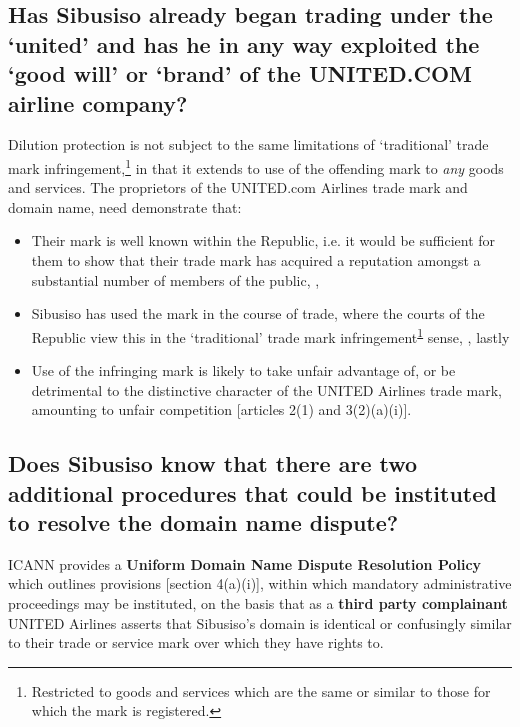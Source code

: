 \documentclass[11pt]{article}
\begin{document}
\subsection{Has Sibusiso already began trading under the `united' and has he in any way exploited the `good will' or `brand' of the UNITED.COM airline company?}
\label{sec:orgc154e15}
Dilution protection is not subject to the same limitations of `traditional'
trade mark infringement,\footnote{Restricted to goods and services which are the same or similar to those for which the mark is registered.\label{org03cdd66}} in that it extends to use of the offending mark to
\emph{any} goods and services. The proprietors of the UNITED.com Airlines trade
mark and domain name, need demonstrate that:
\begin{itemize}
\item Their mark is well known within the Republic, i.e. it would be sufficient for
them to show that their trade mark has acquired a reputation amongst a
substantial number of members of the public,
 \cite{corbett97_mcd_v_joburgers},
\item Sibusiso has used the mark in the course of trade, where the courts of
the Republic view this in the `traditional' trade mark infringement\textsuperscript{\ref{org03cdd66}}
sense,  \cite{harms01_cowbell_v_ics}, lastly
\item Use of the infringing mark is likely to take unfair advantage of, or be
detrimental to the distinctive character of the UNITED Airlines trade mark,
amounting to unfair competition [articles 2(1) and 3(2)(a)(i)]\cite{wipo96_model_provi_unfair_comp}.
\end{itemize}

\subsection{Does Sibusiso know that there are two additional procedures that could be instituted to resolve the domain name dispute?}
\label{sec:orgbc46e53}
ICANN provides a \textbf{Uniform Domain Name Dispute Resolution Policy} which outlines
provisions [section 4(a)(i)]\cite{icann99_policy}, within which mandatory
administrative proceedings may be instituted, on the basis that as a \textbf{third
party complainant} UNITED Airlines asserts that Sibusiso's domain is identical
or confusingly similar to their trade or service mark over which they have
rights to.\\
\end{document}
